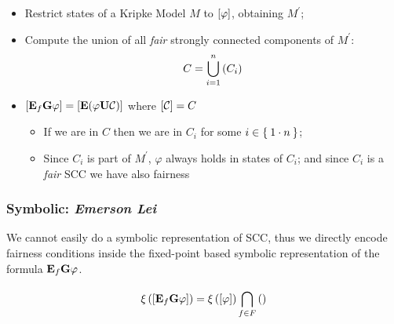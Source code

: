     \begin{itemize}

    \item   Restrict states of a Kripke Model $M$ to
            $\left[{\varphi}\right]$, obtaining $M^\prime$;

    \item   Compute the union of all \emph{fair} strongly connected
            components of $M^\prime$: \[C = \bigcup_{i = 1}^{n}\left({C_i}\right)\]

    \item   $\left[{\mathcal{\mathcal{\sf \bf E}}_{f}{\mathcal{\sf \bf G}\varphi}}\right] =
             \left[{\mathcal{\mathcal{\sf \bf E}}{({\varphi}\mathcal{\sf \bf U}{\mathcal{C}})}}\right]$
            where $\left[{\mathcal{C}}\right] = C$

        \begin{itemize}
        \item   If we are in $C$ then we are in $C_i$ for some $i \in 
                \Set{ 1 \cdot n }$;
        \item   Since $C_i$ is part of $M^\prime$, $\varphi$ always holds
                in states of $C_i$; and since $C_i$ is a \emph{fair} SCC
                we have also fairness
        \end{itemize}

    \end{itemize}

\subsubsection{Symbolic: \emph{Emerson Lei}}

    We cannot easily do a symbolic representation of SCC, thus we directly
    encode fairness conditions inside the fixed-point based symbolic
    representation of the formula $\mathcal{\mathcal{\sf \bf E}}_{f}{\mathcal{\sf \bf G}\varphi}$.

    \[
    \xi\left({\left[{{\mathcal{\mathcal{\sf \bf E}}_{f}{\mathcal{\sf \bf G}\varphi}}}\right]}\right) =
        \xi\left({\left[{{\varphi}}\right]}\right) \bigcap_{f \in F}^{}\left({
        }\right)
    \]

